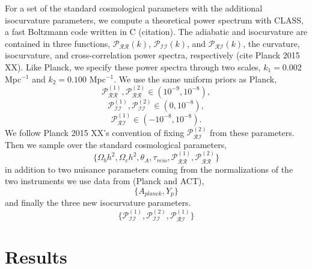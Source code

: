 \documentclass[11pt,a4paper]{emulateapj}
\begin{document}
For a set of the standard cosmological parameters with the additional isocurvature parameters, we compute a theoretical power spectrum  with CLASS, a fast Boltzmann code written in C (citation). The adiabatic and isocurvature are contained in three functions, $\mathcal{P}_{\mathcal{RR}}(k)$, $\mathcal{P}_{\mathcal{II}}(k)$, and $\mathcal{P}_{\mathcal{RI}}(k)$, the curvature, isocurvature, and cross-correlation power spectra, respectively (cite Planck 2015 XX). Like Planck, we specify these power spectra through two scales, $k_1 = 0.002$ Mpc$^{-1}$ and $k_2 = 0.100$ Mpc$^{-1}$. We use the same uniform priors as Planck,
\begin{equation}
    \mathcal{P}_{\mathcal{RR}}^{(1)}, \mathcal{P}_{\mathcal{RR}}^{(2)} \in (10^{-9}, 10^{-8}),
\end{equation}
\begin{equation}
    \mathcal{P}_{\mathcal{II}}^{(1)}, \mathcal{P}_{\mathcal{II}}^{(2)} \in (0, 10^{-8}),
\end{equation}
\begin{equation}
    \mathcal{P}_{\mathcal{RI}}^{(1)} \in (-10^{-8}, 10^{-8}).
\end{equation}
We follow Planck 2015 XX's convention of fixing $\mathcal{P}_{\mathcal{RI}}^{(2)}$ from these parameters. Then we sample over the standard cosmological parameters,
\begin{equation}
\{ \Omega_b h^2, \Omega_c h^2, \theta_A, \tau_{reio}, \mathcal{P}_{\mathcal{RR}}^{(1)}, \mathcal{P}_{\mathcal{RR}}^{(2)} \}
\end{equation}
in addition to two nuisance parameters coming from the normalizations of the two instruments we use data from (Planck and ACT),
\begin{equation}
\{ A_{planck}, Y_p \}
\end{equation}
and finally the three new isocurvature parameters.
\begin{equation}
\{\mathcal{P}_{\mathcal{II}}^{(1)}, \mathcal{P}_{\mathcal{II}}^{(2)}, \mathcal{P}_{\mathcal{RI}}^{(1)}    \}
\end{equation}

\section{Results}



\end{document}
